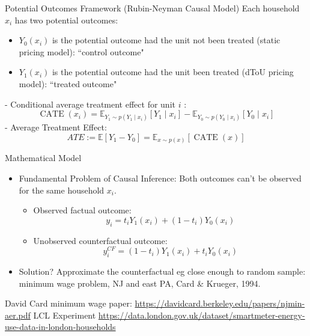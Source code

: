 \documentclass{beamer}
\begin{document}




\begin{frame}{Potential Outcomes Framework (Rubin-Neyman Causal Model)}
  Each household $x_i$ has two potential outcomes:
  \begin{itemize}
    \item $Y_0\left(x_i\right)$ is the potential outcome had the unit not been treated (static pricing model): ``control outcome"
    \item $Y_1\left(x_i\right)$ is the potential outcome had the unit been treated (dToU pricing model): ``treated outcome"
  \end{itemize}
  - Conditional average treatment effect for unit $i$ :
  $$
  \operatorname{CATE}\left(x_i\right)=\mathbb{E}_{Y_1 \sim p\left(Y_1 \mid x_i\right)}\left[Y_1 \mid x_i\right]-\mathbb{E}_{Y_0 \sim p\left(Y_0 \mid x_i\right)}\left[Y_0 \mid x_i\right]
  $$
  - Average Treatment Effect:
  $$
  A T E:=\mathbb{E}\left[Y_1-Y_0\right]=\mathbb{E}_{x \sim p(x)}[\operatorname{CATE}(x)]
  $$
\end{frame}

\begin{frame}{Mathematical Model}
\begin{itemize}
  \item Fundamental Problem of Causal Inference: Both outcomes can't be observed for the same household $x_i$.
  \begin{itemize}
    \item Observed factual outcome:
    $$
    y_i=t_i Y_1\left(x_i\right)+\left(1-t_i\right) Y_0\left(x_i\right)
    $$
    \item Unobserved counterfactual outcome:
    $$
    y_i^{C F}=\left(1-t_i\right) Y_1\left(x_i\right)+t_i Y_0\left(x_i\right)
    $$
  \end{itemize}
  \item Solution? Approximate the counterfactual eg close enough to random sample: minimum wage problem, NJ and east PA, Card \& Krueger, 1994.
\end{itemize}
\end{frame}

\begin{frame}
  David Card minimum wage paper: \url{https://davidcard.berkeley.edu/papers/njmin-aer.pdf}
  LCL Experiment \url{https://data.london.gov.uk/dataset/smartmeter-energy-use-data-in-london-households}
\end{frame}
\end{document}
